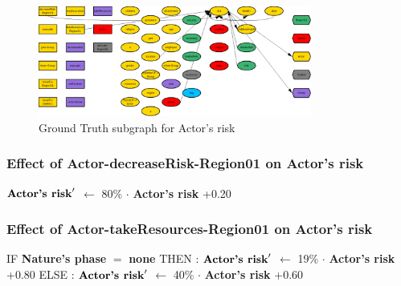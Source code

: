 \documentclass{article}%
\begin{document}
\begin{figure}[ht]%
\centering%
\includegraphics[width=0.8\textwidth]{images/riskOfActor.png}%
\caption{Ground Truth subgraph for Actor's risk}%
\end{figure}

%
\subsubsection{Effect of Actor{-}decreaseRisk{-}Region01 on Actor's risk}%
\label{ssubsec:Effect of Actor{-}decreaseRisk{-}Region01 on Actor's risk}%
\begin{flushleft}%
$\mbox{\textbf{Actor's risk}} '$%
$\leftarrow$%
80\%%
$\cdot$%
\textbf{Actor's risk}%
+0.20%
\end{flushleft}

%
\subsubsection{Effect of Actor{-}takeResources{-}Region01 on Actor's risk}%
\label{ssubsec:Effect of Actor{-}takeResources{-}Region01 on Actor's risk}%
\begin{flushleft}%
IF %
\textbf{Nature's phase}%
$=$%
\textbf{none}%
\linebreak%
\hspace*{2em}%
THEN %
: %
$\mbox{\textbf{Actor's risk}} '$%
$\leftarrow$%
19\%%
$\cdot$%
\textbf{Actor's risk}%
+0.80%
\linebreak%
\hspace*{2em}%
ELSE %
: %
$\mbox{\textbf{Actor's risk}} '$%
$\leftarrow$%
40\%%
$\cdot$%
\textbf{Actor's risk}%
+0.60%
\end{flushleft}

%
\end{document}
